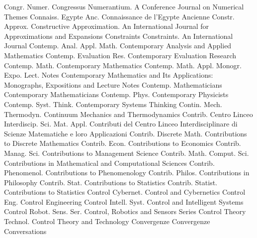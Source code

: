 {Congr. Numer.}
{Congressus Numerantium. A Conference Journal on Numerical Themes}
{Connaiss. Egypte Anc.}
{Connaissance de l'Egypte Ancienne}
{Constr. Approx.}
{Constructive Approximation. An International Journal for Approximations and Expansions}
{Constraints}
{Constraints. An International Journal}
{Contemp. Anal. Appl. Math.}
{Contemporary Analysis and Applied Mathematics}
{Contemp. Evaluation Res.}
{Contemporary Evaluation Research}
{Contemp. Math.}
{Contemporary Mathematics}
{Contemp. Math. Appl. Monogr. Expo. Lect. Notes}
{Contemporary Mathematics and Its Applications: Monographs, Expositions and Lecture Notes}
{Contemp. Mathematicians}
{Contemporary Mathematicians}
{Contemp. Phys.}
{Contemporary Physicists}
{Contemp. Syst. Think.}
{Contemporary Systems Thinking}
{Contin. Mech. Thermodyn.}
{Continuum Mechanics and Thermodynamics}
{Contrib. Centro Linceo Interdiscip. Sci. Mat. Appl.}
{Contributi del Centro Linceo Interdisciplinare di Scienze Matematiche e loro Applicazioni}
{Contrib. Discrete Math.}
{Contributions to Discrete Mathematics}
{Contrib. Econ.}
{Contributions to Economics}
{Contrib. Manag. Sci.}
{Contributions to Management Science}
{Contrib. Math. Comput. Sci.}
{Contributions in Mathematical and Computational Sciences}
{Contrib. Phenomenol.}
{Contributions to Phenomenology}
{Contrib. Philos.}
{Contributions in Philosophy}
{Contrib. Stat.}
{Contributions to Statistics}
{Contrib. Statist.}
{Contributions to Statistics}
{Control Cybernet.}
{Control and Cybernetics}
{Control Eng.}
{Control Engineering}
{Control Intell. Syst.}
{Control and Intelligent Systems}
{Control Robot. Sens. Ser.}
{Control, Robotics and Sensors Series}
{Control Theory Technol.}
{Control Theory and Technology}
{Convergenze}
{Convergenze}
{Conversations}
